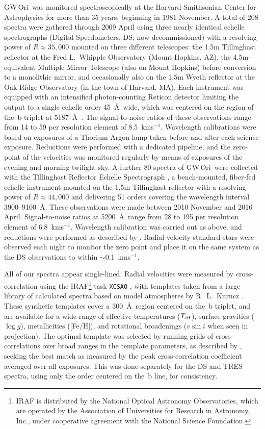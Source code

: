 \documentclass[twocolumn]{aastex61}
\newcommand\kms{\ifmmode{\rm km\thinspace s^{-1}}\else km\thinspace s$^{-1}$\fi}
\newcommand{\gw}{GW\,Ori}
\begin{document}
\gw\ was monitored spectroscopically at the Harvard-Smithsonian Center for Astrophysics for more than 35 years, beginning in 1981 November. A total of 208 spectra were gathered through 2009 April using three nearly identical echelle spectrographs (Digital Speedometers, DS; now decommissioned) with a resolving power of $R \approx 35,000$ mounted on three different telescopes: the 1.5m Tillinghast reflector at the Fred L.\ Whipple Observatory (Mount Hopkins, AZ), the 4.5m-equivalent Multiple Mirror Telescope (also on Mount Hopkins) before conversion to a monolithic mirror, and occasionally also on the 1.5m Wyeth reflector at the Oak Ridge Observatory (in the town of Harvard, MA).  Each instrument was equipped with an intensified photon-counting Reticon detector limiting the output to a single echelle order 45~\AA\ wide, which was centered on the region of the \,b triplet at 5187~\AA\ \citep[see][]{latham92}. The signal-to-noise ratios of these observations range from 14 to 59 per resolution element of 8.5~\kms. Wavelength calibrations were based on exposures of a Thorium-Argon lamp taken before and after each science exposure. Reductions were performed with a dedicated pipeline, and the zero-point of the velocities was monitored regularly by means of exposures of the evening and morning twilight sky. A further 80 spectra of \gw\ were collected with the Tillinghast Reflector Echelle Spectrograph \citep[TRES;][]{furesz08}, a bench-mounted, fiber-fed echelle instrument mounted on the 1.5m Tillinghast reflector with a resolving power of $R \approx 44,000$ and delivering 51 orders covering the wavelength interval 3900--9100~\AA. These observations were made between 2010 November and 2016 April.  Signal-to-noise ratios at 5200~\AA\ range from 28 to 195 per resolution element of 6.8~\kms. Wavelength calibration was carried out as above, and reductions were performed as described by \cite{buchhave10}. Radial-velocity standard stars were observed each night to monitor the zero point and place it on the same system as the DS observations to within $\sim$0.1~\kms.

All of our spectra appear single-lined.  Radial velocities were measured by cross-correlation using the IRAF\footnote{IRAF is distributed by the National Optical Astronomy Observatories, which are operated by the Association of Universities for Research in Astronomy, Inc., under cooperative agreement with the National Science Foundation.} task {\tt XCSAO} \citep{kurtz98}, with templates taken from a large library of calculated spectra based on model atmospheres by R.\ L.\ Kurucz \citep[see][]{nordstroem94,latham02}. These synthetic templates cover a 300~\AA\ region centered on the \,b triplet, and are available for a wide range of effective temperatures ($T_{\rm eff}$), surface gravities ($\log g$), metallicities ([Fe/H]), and rotational broadenings ($v \sin i$ when seen in projection). The optimal template was selected by running grids of cross-correlations over broad ranges in the template parameters, as described by \cite{torres02}, seeking the best match as measured by the peak cross-correlation coefficient averaged over all exposures. This was done separately for the DS and TRES spectra, using only the order centered on the \,b line, for consistency.
\end{document}
